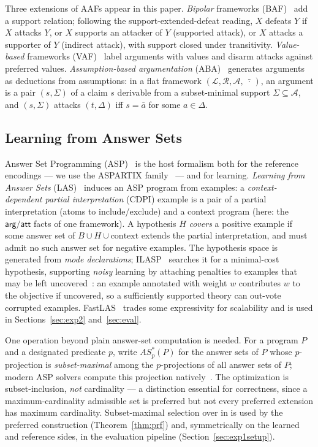 \documentclass[review,12pt]{elsarticle}
\theoremstyle{definition}
\theoremstyle{remark}
\newcommand{\pred}[1]{\textsf{#1}}
\newcommand{\ASstar}{\mathit{AS}^{*}}
\begin{document}
Three extensions of AAFs appear in this paper. \emph{Bipolar} frameworks
(BAF)~\citep{cayrol2009} add a support relation; following the
support-extended-defeat reading, $X$ defeats $Y$ if $X$ attacks $Y$, or $X$
supports an attacker of $Y$ (supported attack), or $X$ attacks a supporter of
$Y$ (indirect attack), with support closed under transitivity.
\emph{Value-based} frameworks (VAF)~\citep{benchcapon2003} label arguments with
values and disarm attacks against preferred values. \emph{Assumption-based
argumentation} (ABA)~\citep{bondarenko1997} generates arguments as deductions
from assumptions: in a flat framework $(\mathcal L,\mathcal R,\mathcal A,\;
\bar{\cdot}\,)$, an argument is a pair $(s,\Sigma)$ of a claim $s$ derivable
from a subset-minimal support $\Sigma\subseteq\mathcal A$, and $(s,\Sigma)$
attacks $(t,\Delta)$ iff $s=\bar a$ for some $a\in\Delta$.

\subsection{Learning from Answer Sets}
\label{sec:bg-las}

Answer Set Programming (ASP)~\citep{gelfondkahl2014,gebser2019} is the host
formalism both for the reference encodings --- we use the ASPARTIX
family~\citep{egly2010} --- and for learning. \emph{Learning from Answer Sets}
(LAS)~\citep{law2016,law2019,law2018phd} induces an ASP program from examples:
a \emph{context-dependent partial interpretation} (CDPI) example is a pair of a
partial interpretation (atoms to include/exclude) and a context program (here:
the $\pred{arg}/\pred{att}$ facts of one framework). A hypothesis $H$
\emph{covers} a positive example if some answer set of
$B\cup H\cup\text{context}$ extends the partial interpretation, and must admit
no such answer set for negative examples. The hypothesis space is generated
from \emph{mode declarations}; ILASP~\citep{law2016} searches it for a
minimal-cost hypothesis, supporting \emph{noisy} learning by attaching penalties
to examples that may be left uncovered~\citep{law2018}: an example annotated
with weight $w$ contributes $w$ to the objective if uncovered, so a
sufficiently supported theory can out-vote corrupted examples.
FastLAS~\citep{law2020} trades some expressivity for scalability and is used in
Sections~\ref{sec:exp2} and~\ref{sec:eval}.

One operation beyond plain answer-set computation is needed. For a program $P$
and a designated predicate $p$, write $\ASstar_p(P)$ for the answer sets of
$P$ whose $p$-projection is \emph{subset-maximal} among the $p$-projections of
all answer sets of $P$; modern ASP solvers compute this projection
natively~\citep{gebser2019}. The optimization is
subset-inclusion, \emph{not} cardinality --- a distinction essential for
correctness, since a maximum-cardinality admissible set is preferred but not
every preferred extension has maximum cardinality. Subset-maximal selection
over \pred{in} is used by the preferred construction (Theorem~\ref{thm:prf})
and, symmetrically on the learned and reference sides, in the evaluation
pipeline (Section~\ref{sec:exp1setup}).
\end{document}
